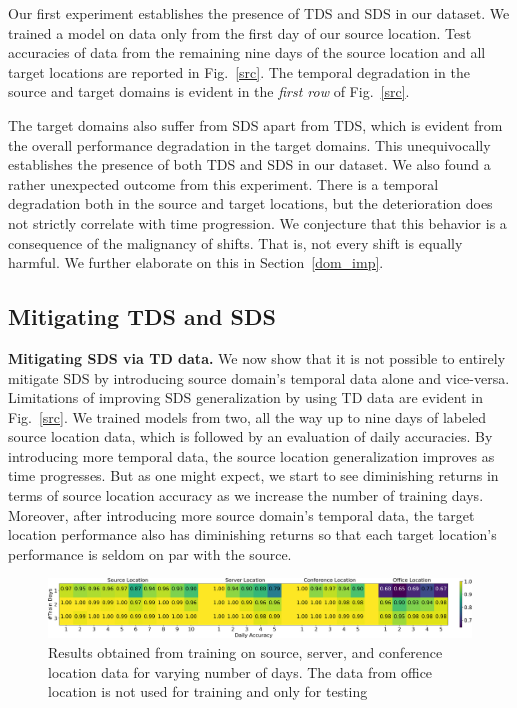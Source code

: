 \documentclass{article}
\begin{document}
Our first experiment establishes the presence of TDS and SDS in our dataset. We trained a model on data only from the first day of our source location. Test accuracies of data from the remaining nine days of the source location and all target locations are reported in Fig.~\ref{src}. The temporal degradation in the source and target domains is evident in the \emph{first row} of Fig.~\ref{src}. 

The target domains also suffer from SDS apart from TDS, which is evident from the overall performance degradation in the target domains. This unequivocally establishes the presence of both TDS and SDS in our dataset. We also found a rather unexpected outcome from this experiment. There is a temporal degradation both in the source and target locations, but the deterioration does not strictly correlate with time progression. We conjecture that this behavior is a consequence of the malignancy of shifts. That is, not every shift is equally harmful. We further elaborate on this in Section~\ref{dom_imp}.

\subsection{Mitigating TDS and SDS}
\textbf{Mitigating SDS via TD data.} We now show that it is not possible to entirely mitigate SDS by introducing source domain's temporal data alone and vice-versa. Limitations of improving SDS generalization by using TD data are evident in Fig.~\ref{src}. We trained models from two, all the way up to nine days of labeled source location data, which is followed by an evaluation of daily accuracies. By introducing more temporal data, the source location generalization improves as time progresses. But as one might expect, we start to see diminishing returns in terms of source location accuracy as we increase the number of training days. Moreover, after introducing more source domain's temporal data, the target location performance also has diminishing returns so that each target location's performance is seldom on par with the source. 

\begin{figure}[ht]
\includegraphics[width=1.0\linewidth]{figures/Exp2.png} 
\caption{Results obtained from training on source, server, and conference location data for varying number of days. The data from office location is not used for training and only for testing}
\label{trg}
\end{figure}
\end{document}
